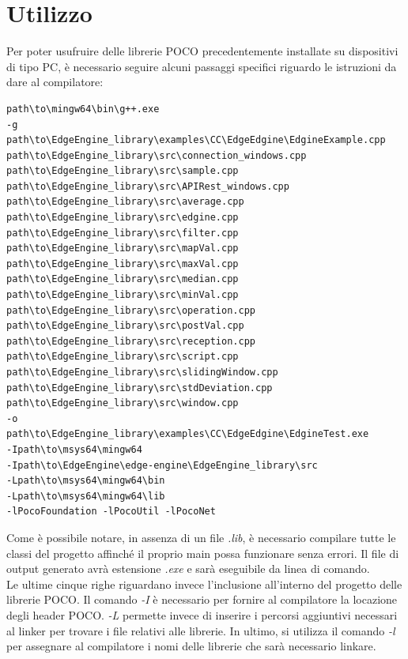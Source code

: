 \section{Utilizzo}\label{utilizzo}
Per poter usufruire delle librerie POCO precedentemente installate su dispositivi di tipo PC, è necessario seguire alcuni passaggi specifici riguardo le istruzioni da dare al compilatore:
\begin{verbatim}
path\to\mingw64\bin\g++.exe 
-g 
path\to\EdgeEngine_library\examples\CC\EdgeEdgine\EdgineExample.cpp
path\to\EdgeEngine_library\src\connection_windows.cpp
path\to\EdgeEngine_library\src\sample.cpp
path\to\EdgeEngine_library\src\APIRest_windows.cpp
path\to\EdgeEngine_library\src\average.cpp
path\to\EdgeEngine_library\src\edgine.cpp
path\to\EdgeEngine_library\src\filter.cpp
path\to\EdgeEngine_library\src\mapVal.cpp
path\to\EdgeEngine_library\src\maxVal.cpp
path\to\EdgeEngine_library\src\median.cpp
path\to\EdgeEngine_library\src\minVal.cpp
path\to\EdgeEngine_library\src\operation.cpp
path\to\EdgeEngine_library\src\postVal.cpp
path\to\EdgeEngine_library\src\reception.cpp
path\to\EdgeEngine_library\src\script.cpp
path\to\EdgeEngine_library\src\slidingWindow.cpp
path\to\EdgeEngine_library\src\stdDeviation.cpp
path\to\EdgeEngine_library\src\window.cpp
-o
path\to\EdgeEngine_library\examples\CC\EdgeEdgine\EdgineTest.exe
-Ipath\to\msys64\mingw64
-Ipath\to\EdgeEngine\edge-engine\EdgeEngine_library\src
-Lpath\to\msys64\mingw64\bin
-Lpath\to\msys64\mingw64\lib
-lPocoFoundation -lPocoUtil -lPocoNet
\end{verbatim}
Come è possibile notare, in assenza di un file \textit{.lib}, è necessario compilare tutte le classi del progetto affinché il proprio main possa funzionare senza errori. Il file di output generato avrà estensione \textit{.exe} e sarà eseguibile da linea di comando.\\
Le ultime cinque righe riguardano invece l'inclusione all'interno del progetto delle librerie POCO. Il comando \textit{-I} è necessario per fornire al compilatore la locazione degli header POCO. \textit{-L}  permette invece di inserire i percorsi aggiuntivi necessari al linker per trovare i file relativi alle librerie. In ultimo, si utilizza il comando \textit{-l} per assegnare al compilatore i nomi delle librerie che sarà necessario linkare.  
\newpage
